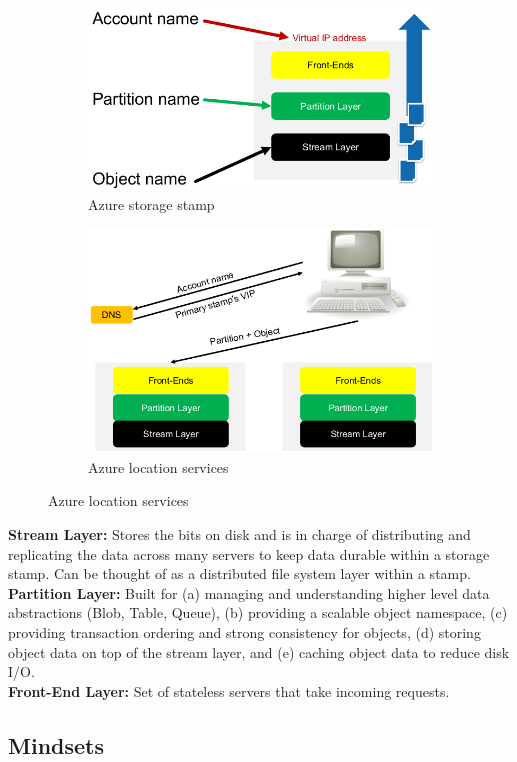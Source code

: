 \documentclass[11pt,oneside,a4paper]{article}
\begin{document}
\vspace{-\topsep}
\begin{figure}[hb!]
	\centering
	\begin{subfigure}[t]{.5\textwidth}
		\centering
		\includegraphics[width=0.5\linewidth]{figures/azure_storage_stamp}
		\caption{Azure storage stamp}
		\label{fig:azure_storage_stamp}
	\end{subfigure}%
	\begin{subfigure}[t]{.5\textwidth}
		\centering
		\includegraphics[width=0.6\linewidth]{figures/azure_location_services}
		\caption{Azure location services}
		\label{fig:azure_location_services}
	\end{subfigure}
\end{figure}

\textbf{Stream Layer:} Stores the bits on disk and is in charge of distributing and replicating the data across many servers to keep data durable within a storage stamp. Can be thought of as a distributed file system layer within a stamp.\\
\textbf{Partition Layer:} Built for (a) managing and understanding higher level data abstractions (Blob, Table, Queue), (b) providing a scalable object namespace, (c) providing transaction ordering and strong consistency for objects, (d) storing object data on top of the stream layer, and (e) caching object data to reduce disk I/O.\\
\textbf{Front-End Layer:} Set of stateless servers that take incoming requests.\\


\subsection{Mindsets}
\end{document}
